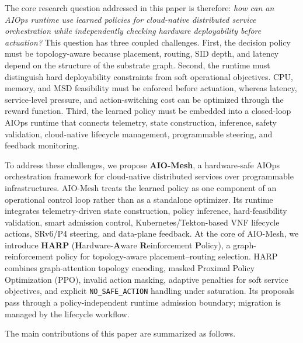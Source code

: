 \documentclass[final,5p]{elsarticle}
\newcommand{\rev}[1]{\textcolor{BrickRed}{#1}}
\begin{document}
The core research question addressed in this paper is therefore: \rev{\emph{how can an AIOps runtime use learned policies for cloud-native distributed service orchestration while independently checking hardware deployability before actuation?}} This question has three coupled challenges. First, the decision policy must be topology-aware because placement, routing, SID depth, and latency depend on the structure of the substrate graph. Second, the runtime must distinguish hard deployability constraints from soft operational objectives. CPU, memory, and MSD feasibility must be enforced before actuation, whereas latency, service-level pressure, and \rev{action-switching cost} can be optimized through the reward function. Third, the learned policy must be embedded into a closed-loop AIOps runtime that connects telemetry, state construction, inference, safety validation, cloud-native lifecycle management, programmable steering, and feedback monitoring.

To address these challenges, we propose \textbf{AIO-Mesh}, a hardware-safe AIOps orchestration framework for cloud-native distributed services over programmable infrastructures. AIO-Mesh treats the learned policy as one component of an operational control loop rather than as a standalone optimizer. Its runtime integrates telemetry-driven state construction, policy inference, hard-feasibility validation, smart admission control, Kubernetes/Tekton-based VNF lifecycle actions, SRv6/P4 steering, and data-plane feedback. At the core of AIO-Mesh, we introduce \textbf{HARP} (\textbf{H}ardware-\textbf{A}ware \textbf{R}einforcement \textbf{P}olicy), a graph-reinforcement policy for \rev{topology-aware placement--routing selection}. HARP combines graph-attention topology encoding, \rev{masked Proximal Policy Optimization (PPO)}, invalid action masking, adaptive penalties for soft service objectives, and explicit \texttt{NO\_SAFE\_ACTION} handling under saturation. \rev{Its proposals pass through a policy-independent runtime admission boundary; migration is managed by the lifecycle workflow.}

The main contributions of this paper are summarized as follows.
\end{document}
